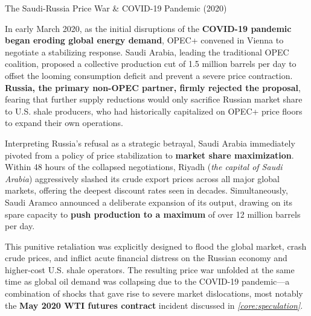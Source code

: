 \documentclass[10pt]{article}
\begin{document}
      \begin{core}[label=core:pandemic]{The Saudi-Russia Price War \& COVID-19 Pandemic (2020)}

        In early March 2020, as the initial disruptions of the \textbf{COVID-19 pandemic began eroding global energy demand}, OPEC+ convened in Vienna to negotiate a stabilizing response. Saudi Arabia, leading the traditional OPEC coalition, proposed a collective production cut of 1.5 million barrels per day to offset the looming consumption deficit and prevent a severe price contraction. \textbf{Russia, the primary non-OPEC partner, firmly rejected the proposal}, fearing that further supply reductions would only sacrifice Russian market share to U.S. shale producers, who had historically capitalized on OPEC+ price floors to expand their own operations.

        Interpreting Russia's refusal as a strategic betrayal, Saudi Arabia immediately pivoted from a policy of price stabilization to \textbf{market share maximization}. Within 48 hours of the collapsed negotiations, Riyadh (\textit{the capital of Saudi Arabia}) aggressively slashed its crude export prices across all major global markets, offering the deepest discount rates seen in decades. Simultaneously, Saudi Aramco announced a deliberate expansion of its output, drawing on its spare capacity to \textbf{push production to a maximum} of over 12 million barrels per day.


        This punitive retaliation was explicitly designed to flood the global market, crash crude prices, and inflict acute financial distress on the Russian economy and higher-cost U.S. shale operators. The resulting price war unfolded at the same time as global oil demand was collapsing due to the COVID-19 pandemic---a combination of shocks that gave rise to severe market dislocations, most notably the \textbf{May 2020 WTI futures contract} incident discussed in \textit{\autoref{core:speculation}}.

      \end{core}
\end{document}
